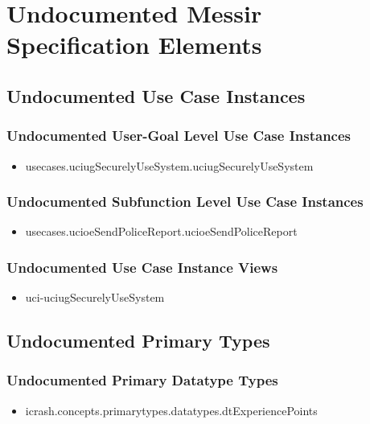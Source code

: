	
\chapter{Undocumented Messir Specification Elements}





\section[Undocumented Use Case Instances]{Undocumented Use Case Instances}


\subsection[Undocumented Use Case Instances - User-Goal Level]{Undocumented User-Goal Level Use Case Instances}
\begin{itemize}
\item usecases.uciugSecurelyUseSystem.uciugSecurelyUseSystem 
\end{itemize}

\subsection[Undocumented Use Case Instances - Subfunction Level]{Undocumented Subfunction Level Use Case Instances}
\begin{itemize}
\item usecases.ucioeSendPoliceReport.ucioeSendPoliceReport 
\end{itemize}

\subsection[Undocumented Use Case Instance Views]{Undocumented Use Case Instance Views}
\begin{itemize}
\item uci-uciugSecurelyUseSystem 
\end{itemize}






\section[Undocumented Primary Types]{Undocumented Primary Types}


\subsection[Undocumented Primary Datatype Types]{Undocumented Primary Datatype Types}
\begin{itemize}
\item icrash.concepts.primarytypes.datatypes.dtExperiencePoints 
\end{itemize}

